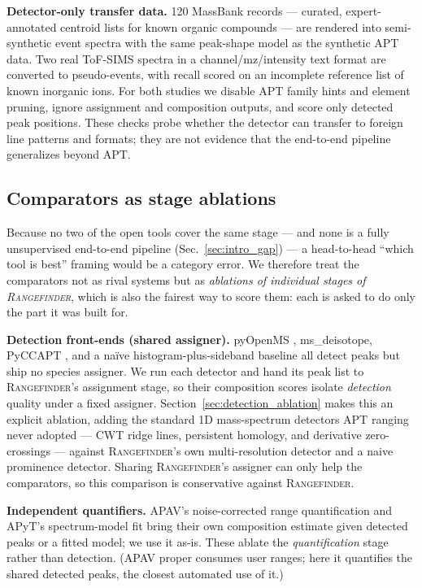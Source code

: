 \documentclass[11pt]{article}
\newcommand{\rf}{\textsc{Rangefinder}}
\begin{document}
\textbf{Detector-only transfer data.} 120 MassBank records
\citep{massbank2024} --- curated, expert-annotated centroid lists for known
organic compounds --- are rendered into semi-synthetic event spectra with
the same peak-shape model as the synthetic APT data. Two real ToF-SIMS
spectra in a channel/mz/intensity text format \citep{zenodo15446699} are
converted to pseudo-events, with recall scored on an incomplete reference
list of known inorganic ions. For both studies we disable APT family hints
and element pruning, ignore assignment and composition outputs, and score
only detected peak positions. These checks probe whether the detector can
transfer to foreign line patterns and formats; they are not evidence that
the end-to-end pipeline generalizes beyond APT.

\subsection{Comparators as stage ablations}
\label{sec:comparators}
Because no two of the open tools cover the same stage --- and none is a
fully unsupervised end-to-end pipeline (Sec.~\ref{sec:intro_gap}) --- a
head-to-head ``which tool is best'' framing would be a category error. We
therefore treat the comparators not as rival systems but as \emph{ablations
of individual stages of \rf{}}, which is also the fairest way to score them:
each is asked to do only the part it was built for.

\textbf{Detection front-ends (shared assigner).} pyOpenMS
\citep{rost2016openms}, ms\_deisotope, PyCCAPT \citep{monajem2025pyccapt},
and a na\"ive histogram-plus-sideband baseline all detect peaks but ship no
species assigner. We run each detector and hand its peak list to \rf{}'s
assignment stage, so their composition scores isolate \emph{detection}
quality under a fixed assigner. Section~\ref{sec:detection_ablation} makes
this an explicit ablation, adding the standard 1D mass-spectrum detectors
APT ranging never adopted --- CWT ridge lines, persistent homology, and
derivative zero-crossings --- against \rf{}'s own multi-resolution detector
and a naive prominence detector. Sharing \rf{}'s assigner can only help the
comparators, so this comparison is conservative against \rf{}.

\textbf{Independent quantifiers.} APAV's noise-corrected range
quantification \citep{smith2023apav} and APyT's spectrum-model fit bring
their own composition estimate given detected peaks or a fitted model; we
use it as-is. These ablate the \emph{quantification} stage rather than
detection. (APAV proper consumes user ranges; here it quantifies the
shared detected peaks, the closest automated use of it.)
\end{document}
